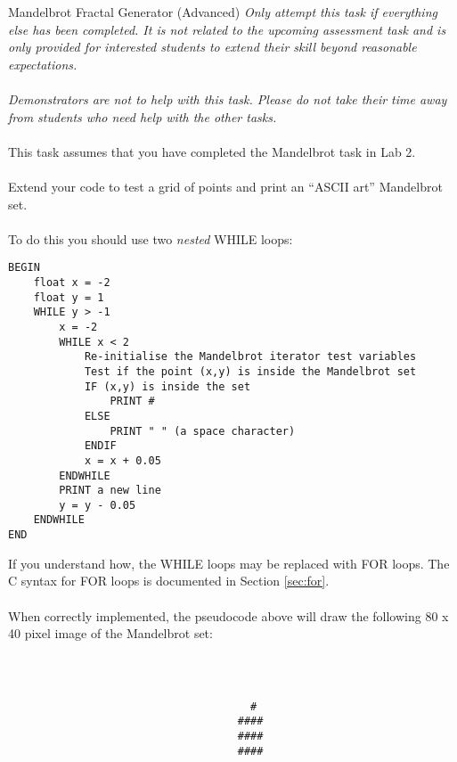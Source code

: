 \documentclass{lab}
\begin{document}
\begin{task}{Mandelbrot Fractal Generator (Advanced)}{}
\textit{Only attempt this task if everything else has been completed. It is not related to the upcoming assessment task and is only provided for interested students to extend their skill beyond reasonable expectations.\\ \\Demonstrators are not to help with this task. Please do not take their time away from students who need help with the other tasks.}
\\ \\
This task assumes that you have completed the Mandelbrot task in Lab 2.
\\ \\
Extend your code to test a grid of points and print an ``ASCII art'' Mandelbrot set.
\\ \\
To do this you should use two \textit{nested} WHILE loops:

\begin{lstlisting}[style=pseudo]
BEGIN
	float x = -2
	float y = 1
	WHILE y > -1
		x = -2
		WHILE x < 2
			Re-initialise the Mandelbrot iterator test variables
			Test if the point (x,y)	is inside the Mandelbrot set
			IF (x,y) is inside the set
				PRINT #
			ELSE
				PRINT " " (a space character)
			ENDIF
			x = x + 0.05
		ENDWHILE
		PRINT a new line
		y = y - 0.05
	ENDWHILE
END
\end{lstlisting}

If you understand how, the WHILE loops may be replaced with FOR loops. The C syntax for FOR loops is documented in Section \ref{sec:for}.
\\ \\
When correctly implemented, the pseudocode above will draw the following 80 x 40 pixel image of the Mandelbrot set:

\begin{lstlisting}[style=pseudo,basicstyle=\ttfamily\tiny]
                                                                                 
                                                                                 
                                                                                 
                                      #                                          
                                    ####                                         
                                    ####                                         
                                    ####                                         
                                                                                 

\end{lstlisting}
\end{task}
\end{document}
